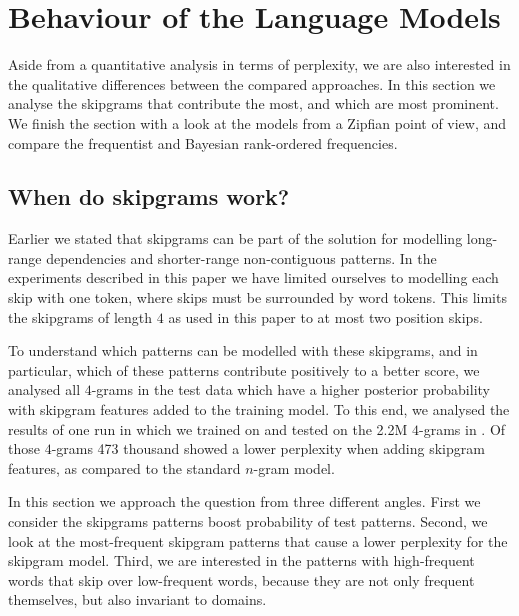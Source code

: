  \section{Behaviour of the Language Models}
Aside from a quantitative analysis in terms of perplexity, we are also interested in the qualitative differences between the compared approaches. In this section we analyse the skipgrams that contribute the most, and which are most prominent. We finish the section with a look at the models from a Zipfian point of view, and compare the frequentist and Bayesian rank-ordered frequencies.

\subsection{When do skipgrams work?}
Earlier we stated that skipgrams can be part of the solution for modelling long-range dependencies and shorter-range non-contiguous patterns. In the experiments described in this paper we have limited ourselves to modelling each skip with one token, where skips must be surrounded by word tokens. This limits the skipgrams of length $4$ as used in this paper to at most two position skips.

To understand which patterns can be modelled with these skipgrams, and in particular, which of these patterns contribute positively to a better score, we analysed all $4$-grams in the test data which have a higher posterior probability with skipgram features added to the training model. 
%
To this end, we analysed the results of one run in which we trained on \obw and tested on the 2.2M $4$-grams in \emea. Of those $4$-grams 473 thousand showed a lower perplexity when adding skipgram features, as compared to the standard $n$-gram model. 

In this section we approach the question from three different angles. First we consider the skipgrams patterns boost probability of test patterns. Second, we look at the most-frequent skipgram patterns that cause a lower perplexity for the skipgram model. Third, we are interested in the patterns with high-frequent words that skip over low-frequent words, because they are not only frequent themselves, but also invariant to domains. 


